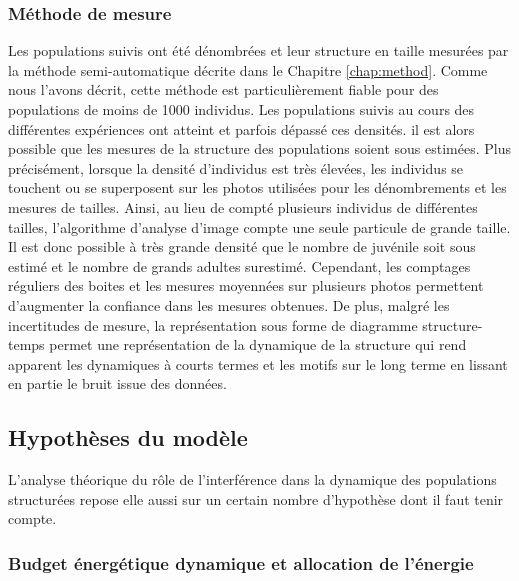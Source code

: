 \subsubsection{Méthode de mesure}

Les populations suivis ont été dénombrées et leur structure en taille mesurées
par la méthode semi-automatique décrite dans le Chapitre \ref{chap:method}.
Comme nous l'avons décrit, cette méthode est particulièrement fiable pour des
populations de moins de 1000 individus. Les populations suivis au
cours des différentes expériences ont atteint et parfois dépassé ces densités.
il est alors possible que les mesures de la structure des populations soient
sous estimées. Plus précisément, lorsque la densité d'individus est très
élevées, les individus se touchent ou se superposent sur les photos utilisées
pour les dénombrements et les mesures de tailles. Ainsi, au lieu de compté
plusieurs individus de différentes tailles, l'algorithme d'analyse d'image
compte une seule particule de grande taille. Il est donc possible à très grande
densité que le nombre de juvénile soit sous estimé et le nombre de grands
adultes surestimé. Cependant, les comptages réguliers des boites et les
mesures moyennées sur plusieurs photos permettent d'augmenter la confiance dans
les mesures obtenues. De plus, malgré les incertitudes de mesure, la
représentation sous forme de diagramme structure-temps permet une représentation
de la dynamique de la structure qui rend apparent les dynamiques à courts termes
et les motifs sur le long terme en lissant en partie le bruit issue des données. 

\subsection{Hypothèses du modèle}

L'analyse théorique du rôle de l'interférence dans la dynamique des populations
structurées repose elle aussi sur un certain nombre d'hypothèse dont il faut
tenir compte. 

\subsubsection{Budget énergétique dynamique et allocation de l'énergie}

